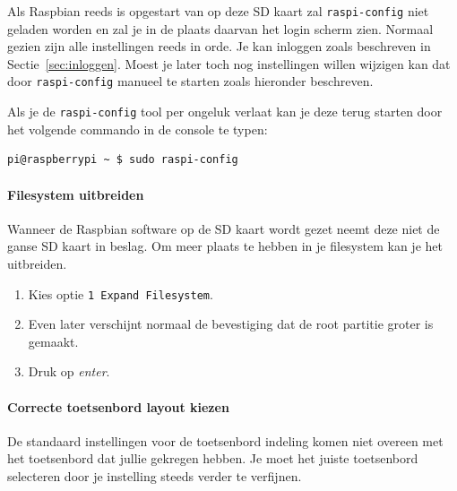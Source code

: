 \documentclass[a4paper]{article}
\begin{document}
      Als Raspbian reeds is opgestart van op deze SD kaart zal
\texttt{raspi-config} niet geladen worden en zal je in de plaats
daarvan het login scherm zien.  Normaal gezien zijn alle instellingen
reeds in orde.  Je kan inloggen zoals beschreven in
Sectie~\ref{sec:inloggen}.  Moest je later toch nog instellingen
willen wijzigen kan dat door \texttt{raspi-config} manueel te starten
zoals hieronder beschreven.

      Als je de \texttt{raspi-config} tool per ongeluk verlaat kan je
deze terug starten door het volgende commando in de console te typen:

\begin{lstlisting}
pi@raspberrypi ~ $ sudo raspi-config
\end{lstlisting}

      \paragraph{Filesystem uitbreiden}
      Wanneer de Raspbian software op de SD kaart wordt gezet neemt
deze niet de ganse SD kaart in beslag.  Om meer plaats te hebben in je
filesystem kan je het uitbreiden.

      \begin{enumerate}
        \item Kies optie \texttt{1 Expand Filesystem}.
        \item Even later verschijnt normaal de bevestiging dat de root partitie
groter is gemaakt.  
        \item Druk op \emph{enter}.
      \end{enumerate}

      \paragraph{Correcte toetsenbord layout kiezen}
      De standaard instellingen voor de toetsenbord indeling komen niet
overeen met het toetsenbord dat jullie gekregen hebben.  Je moet het
juiste toetsenbord selecteren door je instelling steeds verder te
verfijnen.
\end{document}
